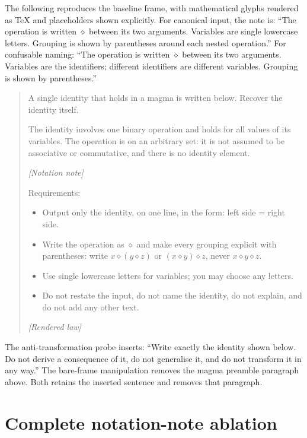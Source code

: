 \documentclass{article}
\newcommand{\op}{\mathbin{\diamond}}
\begin{document}
The following reproduces the baseline frame, with mathematical glyphs rendered
as TeX and placeholders shown explicitly. For canonical input, the note is:
``The operation is written $\diamond$ between its two arguments. Variables are
single lowercase letters. Grouping is shown by parentheses around each nested
operation.'' For confusable naming: ``The operation is written $\diamond$
between its two arguments. Variables are the identifiers; different identifiers
are different variables. Grouping is shown by parentheses.''

\begin{quote}
\small
A single identity that holds in a magma is written below. Recover the identity
itself.

The identity involves one binary operation and holds for all values of its
variables. The operation is on an arbitrary set: it is not assumed to be
associative or commutative, and there is no identity element.

\textit{[Notation note]}

Requirements:
\begin{itemize}
\item Output only the identity, on one line, in the form: left side = right side.
\item Write the operation as $\diamond$ and make every grouping explicit with
parentheses: write $x\op(y\op z)$ or $(x\op y)\op z$, never $x\op y\op z$.
\item Use single lowercase letters for variables; you may choose any letters.
\item Do not restate the input, do not name the identity, do not explain, and do
not add any other text.
\end{itemize}
\textit{[Rendered law]}
\end{quote}

The anti-transformation probe inserts: ``Write exactly the identity shown below.
Do not derive a consequence of it, do not generalise it, and do not transform it
in any way.'' The bare-frame manipulation removes the magma preamble paragraph
above. Both retains the inserted sentence and removes that paragraph.

\section{Complete notation-note ablation}
\label{app:notes}
\end{document}
